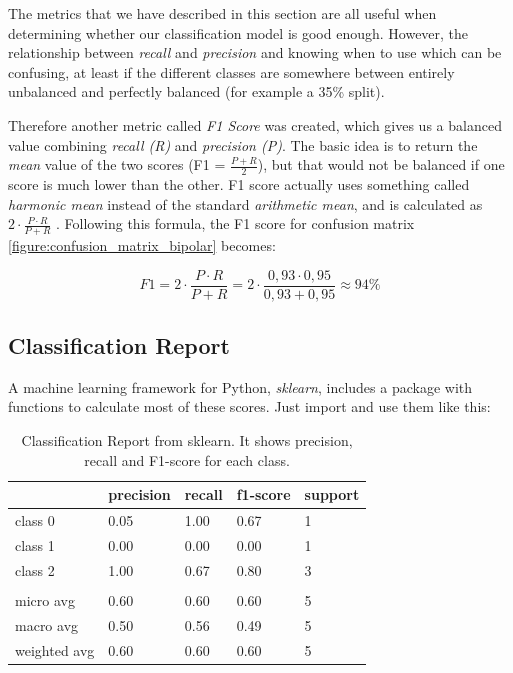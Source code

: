 The metrics that we have described in this section are all useful when determining whether our classification model is good enough. However, the relationship between \textit{recall} and \textit{precision} and knowing when to use which can be confusing, at least if the different classes are somewhere between entirely unbalanced and perfectly balanced (for example a 35\% split). 

Therefore another metric called \textit{F1 Score} was created, which gives us a balanced value combining \textit{recall (R)} and \textit{precision (P)}. The basic idea is to return the \textit{mean} value of the two scores (F1 = $ \frac{P + R}{2} $), but that would not be balanced if one score is much lower than the other. F1 score actually uses something called \textit{harmonic mean} instead of the standard \textit{arithmetic mean}, and is calculated as $ 2 \cdot \frac{P \cdot R}{P + R} $ \cite{ml_metrics}. 
Following this formula, the F1 score for confusion matrix \ref{figure:confusion_matrix_bipolar} becomes:

\[
  F1 = 2 \cdot \frac{P \cdot R}{P + R} = 2 \cdot \frac{0,93 \cdot 0,95}{0,93 + 0,95} \approx 94\%
\]

\subsection{Classification Report}

A machine learning framework for Python, \textit{sklearn}, includes a package with functions to calculate most of these scores. Just import and use them like this: 



\begin{table}[h]
\begin{center}
  \begin{tabular}{| l | l | l | l | l |}
    \hline
                  & precision & recall  & f1-score & support \\ \hline
    class 0       & 0.05      & 1.00    & 0.67     & 1       \\
    class 1       & 0.00      & 0.00    & 0.00     & 1       \\
    class 2       & 1.00      & 0.67    & 0.80     & 3       \\
                  &           &         &          &         \\ 
    micro avg     & 0.60      & 0.60    & 0.60     & 5       \\
    macro avg     & 0.50      & 0.56    & 0.49     & 5       \\
    weighted avg  & 0.60      & 0.60    & 0.60     & 5       \\
    \hline
  \end{tabular}
  \caption{Classification Report from sklearn. It shows precision, recall and F1-score for each class.}
  \label{table:classification_report}
\end{center}
\end{table}

